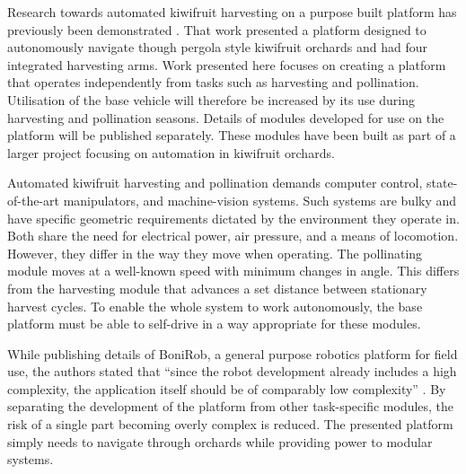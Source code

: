 \documentclass[preprint,authoryear,12pt]{elsarticle}
\begin{document}
    Research towards automated kiwifruit harvesting on a purpose built platform has previously been demonstrated \citep{Scarfe2012}.
    That work presented a platform designed to autonomously navigate though pergola style kiwifruit orchards and had four integrated harvesting arms.
    Work presented here focuses on creating a platform that operates independently from tasks such as harvesting and pollination.
    Utilisation of the base vehicle will therefore be increased by its use during harvesting and pollination seasons.
    Details of modules developed for use on the platform will be published separately.
    These modules have been built as part of a larger project focusing on automation in kiwifruit orchards.

    Automated kiwifruit harvesting and pollination demands computer control, state-of-the-art manipulators, and machine-vision systems.
    Such systems are bulky and have specific geometric requirements dictated by the environment they operate in.
    Both share the need for electrical power, air pressure, and a means of locomotion.
    However, they differ in the way they move when operating.
    The pollinating module moves at a well-known speed with minimum changes in angle.
    This differs from the harvesting module that advances a set distance between stationary harvest cycles.
    To enable the whole system to work autonomously, the base platform must be able to self-drive in a way appropriate for these modules.

    While publishing details of BoniRob, a general purpose robotics platform for field use, the authors stated that ``since the robot development already includes a high complexity, the application itself should be of comparably low complexity'' \citep{Ruckelshausen2009}.
    By separating the development of the platform from other task-specific modules, the risk of a single part becoming overly complex is reduced.
    The presented platform simply needs to navigate through orchards while providing power to modular systems.
\end{document}
